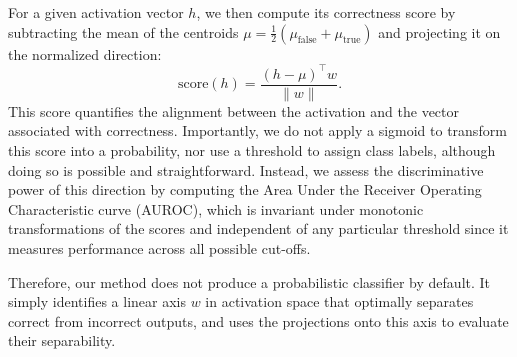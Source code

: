 \documentclass{article} %
\begin{document}
For a given activation vector \(h\), we then compute its correctness score by subtracting the mean of the centroids $\mu = \frac{1}{2}\left(\mu_{\text{false}} + \mu_{\text{true}}\right) $ and projecting it on the normalized direction:
\[
\text{score}(h) = \frac{(h-\mu)^\top w}{\|w\|}. %
\]
This score quantifies the alignment between the activation and the vector associated with correctness. Importantly, we do not apply a sigmoid to transform this score into a probability, nor use a threshold to assign class labels, although doing so is possible and straightforward. Instead, we assess the discriminative power of this direction by computing the Area Under the Receiver Operating Characteristic curve (AUROC), which is invariant under monotonic transformations of the scores and independent of any particular threshold since it measures performance across all possible cut-offs.

Therefore, our method does not produce a probabilistic classifier by default. It simply identifies a linear axis $w$ in activation space that optimally separates correct from incorrect outputs, and uses the projections onto this axis to evaluate their separability.

\end{document}
